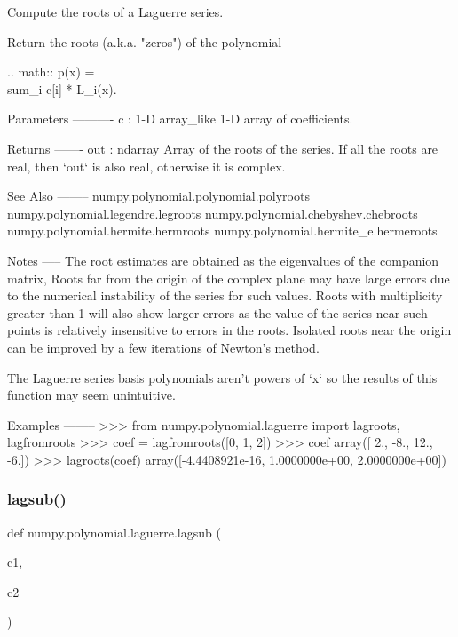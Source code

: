 \begin{DoxyVerb}Compute the roots of a Laguerre series.

Return the roots (a.k.a. "zeros") of the polynomial

.. math:: p(x) = \\sum_i c[i] * L_i(x).

Parameters
----------
c : 1-D array_like
    1-D array of coefficients.

Returns
-------
out : ndarray
    Array of the roots of the series. If all the roots are real,
    then `out` is also real, otherwise it is complex.

See Also
--------
numpy.polynomial.polynomial.polyroots
numpy.polynomial.legendre.legroots
numpy.polynomial.chebyshev.chebroots
numpy.polynomial.hermite.hermroots
numpy.polynomial.hermite_e.hermeroots

Notes
-----
The root estimates are obtained as the eigenvalues of the companion
matrix, Roots far from the origin of the complex plane may have large
errors due to the numerical instability of the series for such
values. Roots with multiplicity greater than 1 will also show larger
errors as the value of the series near such points is relatively
insensitive to errors in the roots. Isolated roots near the origin can
be improved by a few iterations of Newton's method.

The Laguerre series basis polynomials aren't powers of `x` so the
results of this function may seem unintuitive.

Examples
--------
>>> from numpy.polynomial.laguerre import lagroots, lagfromroots
>>> coef = lagfromroots([0, 1, 2])
>>> coef
array([  2.,  -8.,  12.,  -6.])
>>> lagroots(coef)
array([-4.4408921e-16,  1.0000000e+00,  2.0000000e+00])\end{DoxyVerb}
 \mbox{\label{namespacenumpy_1_1polynomial_1_1laguerre_aaa7ba7b9c5949327368bb985fcecad1c}} 
\subsubsection{\texorpdfstring{lagsub()}{lagsub()}}
{\footnotesize\ttfamily def numpy.\+polynomial.\+laguerre.\+lagsub (\begin{DoxyParamCaption}\item[{}]{c1,  }\item[{}]{c2 }\end{DoxyParamCaption})}

